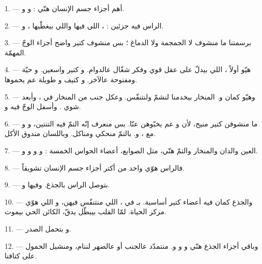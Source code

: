 \VUsaut{2.4mm}
\VUsaut{3.0mm}

\VUsaut{3.0mm}

1. --- أهم أجزاء جسم الإنسان هنّي :  و
و.

2. --- الراس فيه جزئين : ، اللي فيها
 واللي بيغطّيها ، و.

3. --- برسمتنا ما منشوف لا الجمجمة ولا الدماغ ؛ بس منشوف كتير واضح
أجزاء الوجّ المهمّة.

4. --- هيّو أولاً ، اللي بيدلّ على عقل قوي وفكر شغّال
عالدوام. و كتير واسعين. و حيّة ومفتوحة
عالآخر. و كتيف و طويلة عم يحموها.

5. --- وهيّو كمان  و. المنخار بيخدمنا
لنشمّ ولنتنفّس. وعكل جنب من المنخار في ، وأبعد شوي
. وأسفل الوجّ فيه  و.

6. --- ما منشوفن كتير منيح، لأن  و عم
يخبّوهن عنّا. بس منعرف إنّه التمّ فيه  التنتين،
و و مع ،
و. بالتمّ منحكي ومناكل. وباللسان مندوق الأكل.

7. --- العين والدان والمنخار والتمّ هنّي، متل الصوابع، أعضاء الحواس
الخمسة :  و و و
و.

8. --- فالراس هوّي واحد من أكتر أجزاء جسم الإنسان تشويقاً.

\VUsaut{4.4mm}
\VUsaut{3.0mm}

9. ---  بتوصل الراس بالجذع. وفيها 
و.

10. --- والجذع كمان فيه أعضاء كتير أساسية. بـ في
، اللي منتنفّس فيهن، و اللي هوّي مركز
الحياة. لمّا القلب بيبطّل يدقّ، الكائن الحي بيموت.

11. --- و بتحمل الصدر.

12. --- وباقي أجزاء الجذع هنّي  و
و و. منتمدّد عالجنب أو عالضهر لننام،
ومنشيل الحمول على كتافنا.

